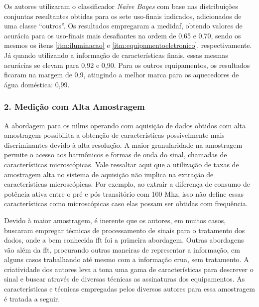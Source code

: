 \begin{enumerate}[label=\textbf{1.\arabic*},wide=\parindent]
Os autores utilizaram o classificador \emph{Naïve Bayes} com base nas
distribuições conjuntas resultantes obtidas para os sete uso-finais
indicados, adicionados de uma classe ``outros''.  Os resultados
empregaram a \acs{medidaf}, obtendo valores de acurácia para os
uso-finais mais desafiantes na ordem de 0,65 e 0,70, sendo os mesmos
os itens \ref{itm:iluminacao} e \ref{itm:equipamentoeletronico},
respectivamente. Já quando utilizando a informação de características
finais, essas mesmas acurácias se elevam para 0,92 e 0,90. Para os
outros equipamentos, os resultados ficaram na margem de 0,9, atingindo a
melhor marca para os aquecedores de água doméstica: 0,99.

\end{enumerate}

\subsubsection{2. Medição com Alta Amostragem}
\label{top:nilm_alta_am}

A abordagem para os \glspl{nilm} operando com aquisição de dados
obtidos com alta amostragem possibilita a obtenção de características
possivelmente mais discriminantes devido à alta resolução. A maior
granularidade na amostragem permite o acesso aos harmônicos e formas
de onda do sinal, chamadas de características microscópicas. Vale
ressaltar aqui que a utilização de taxas de amostragem alta no
sistema de aquisição não implica na extração de características
microscópicas. Por exemplo, ao extrair a diferença de consumo de
potência ativa entre o pré e pós transitório com 100 M\acs{hz},
isso não define essas características como microscópicas caso elas
possam ser obtidas com frequência.
 
Devido à maior amostragem, é inerente que os autores, em muitos casos,
buscaram empregar técnicas de processamento de sinais para o
tratamento dos dados, onde a bem conhecida \gls{fft} foi a primeira
abordagem. Outras abordagens vão além da \gls{fft}, procurando outras
maneiras de representar a informação, em alguns casos trabalhando até
mesmo com a informação crua, sem tratamento. A criatividade dos
autores leva a tona uma gama de características para descrever o sinal
e buscar através de diversas técnicas as assinaturas dos equipamentos. As
características e técnicas empregadas pelos diversos autores para essa
amostragem é tratada a seguir.

